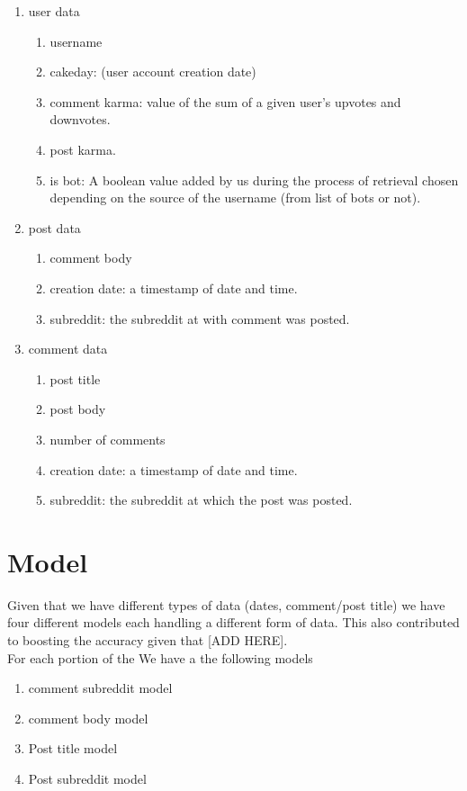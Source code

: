 \documentclass{article}
\begin{document}
    \begin{enumerate}
        \item user data
            \begin{enumerate}
                \item username
                \item cakeday: (user account creation date)
                \item comment karma: value of the sum of a given user's upvotes and downvotes.
                \item post karma.
                \item is bot: A boolean value added by us during the process of retrieval chosen depending on the source of the username (from list of bots or not).
            \end{enumerate}
        \item post data
            \begin{enumerate}
                \item comment body
                \item creation date: a timestamp of date and time.
                \item subreddit: the subreddit at with comment was posted.
            \end{enumerate}
        \item comment data
            \begin{enumerate}
                \item post title
                \item post body
                \item number of comments
                \item creation date: a timestamp of date and time.
                \item subreddit: the subreddit at which the post was posted.
            \end{enumerate}
    \end{enumerate}
\section{Model}
    Given that we have different types of data (dates, comment/post title) we have four different models each handling a different form of data. This also contributed to boosting the accuracy given that [ADD HERE].\\
    For each portion of the
    We have a the following models
    \begin{enumerate}
        \item comment subreddit model
        \item comment body model
        \item Post title model
        \item Post subreddit model
    \end{enumerate}
    
\end{document}
